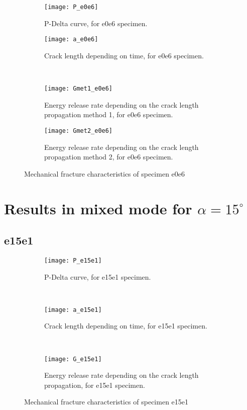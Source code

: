 \begin{figure}[H]
	\centering
	\begin{subfigure}{0.48\linewidth}
		\centering
		\texttt{[image: P\_e0e6]}
		\decoRule
		\caption{P-Delta curve, for e0e6 specimen.}
		\label{fig:P_e0e6}
	\end{subfigure}
	\hfill 
	\begin{subfigure}{0.48\linewidth}
		\centering
		\texttt{[image: a\_e0e6]}
		\decoRule
		\caption{Crack length depending on time, for e0e6 specimen.}
		\label{fig:a_e0e6}
	\end{subfigure}
	\hfill\\
	\begin{subfigure}{0.48\linewidth}
		\centering
		\texttt{[image: Gmet1\_e0e6]}
		\decoRule
		\caption{Energy release rate depending on the crack length propagation method 1, for e0e6 specimen.}
		\label{fig:Gmet1_e0e6}
	\end{subfigure}
	\hfill 
	\begin{subfigure}{0.48\linewidth}
		\centering
		\texttt{[image: Gmet2\_e0e6]}
		\decoRule
		\caption{Energy release rate depending on the crack length propagation method 2, for e0e6 specimen.}
		\label{fig:Gmet2_e0e6}
	\end{subfigure}
	\caption{Mechanical fracture characteristics of specimen e0e6}
	\label{e0e6}
\end{figure}



\section{Results in mixed mode for $\alpha=15 ^\circ$}

\subsection{e15e1}

\begin{figure}[H]
	\centering
\begin{subfigure}{0.48\linewidth}
	\centering
	\texttt{[image: P\_e15e1]}
	\decoRule
	\caption{P-Delta curve, for e15e1 specimen.}
	\label{fig:P_e15e1}
\end{subfigure}
\hfill \\
\begin{subfigure}{0.48\linewidth}
	\centering
	\texttt{[image: a\_e15e1]}
	\decoRule
	\caption{Crack length depending on time, for e15e1 specimen.}
	\label{fig:a_e15e1}
\end{subfigure}
\hfill\\
\begin{subfigure}{0.48\linewidth}
	\centering
	\texttt{[image: G\_e15e1]}
	\decoRule
	\caption{Energy release rate depending on the crack length propagation, for e15e1 specimen.}
	\label{fig:G_e15e1}
\end{subfigure}
\caption{Mechanical fracture characteristics of specimen e15e1}
\label{e15e1}
\end{figure}

